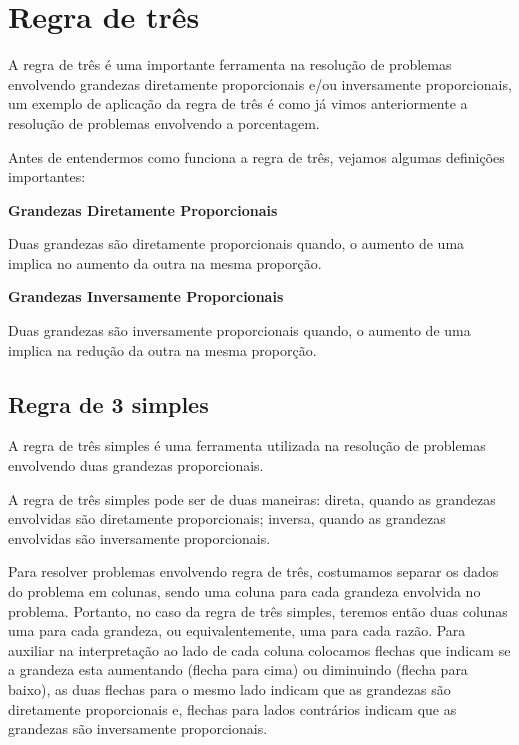 \chapter{Regra de três}

A regra de três é uma importante ferramenta na resolução de problemas envolvendo grandezas diretamente proporcionais e/ou inversamente proporcionais, um exemplo de aplicação da regra de três é como já vimos anteriormente a resolução de problemas envolvendo a porcentagem.

Antes de entendermos como funciona a regra de três, vejamos algumas definições importantes:

\vskip0.3cm

\colorbox{azul}{
 \begin{minipage}{0.9\linewidth}
 \begin{center}
 \textbf{Grandezas Diretamente Proporcionais}

   Duas grandezas são diretamente proporcionais quando, o aumento de uma implica no aumento da outra na mesma proporção.
 \end{center}
 \end{minipage}}

 \vskip0.3cm

\colorbox{azul}{
 \begin{minipage}{0.9\linewidth}
 \begin{center}
 \textbf{Grandezas Inversamente Proporcionais}

   Duas grandezas são inversamente proporcionais quando, o aumento de uma implica na redução da outra na mesma proporção.
 \end{center}
 \end{minipage}}

 \vskip0.3cm


\section{Regra de 3 simples}

A regra de três simples é uma ferramenta utilizada na resolução de problemas envolvendo duas grandezas proporcionais.

A regra de três simples pode ser de duas maneiras: direta, quando as grandezas envolvidas são diretamente proporcionais; inversa, quando as grandezas envolvidas são inversamente proporcionais.

Para resolver problemas envolvendo regra de três, costumamos separar os dados do problema em colunas, sendo uma coluna para cada grandeza envolvida no problema. Portanto, no caso da regra de três simples, teremos então duas colunas uma para cada grandeza, ou equivalentemente, uma para cada razão. Para auxiliar na interpretação ao lado de cada coluna colocamos flechas que indicam se a grandeza esta aumentando (flecha para cima) ou diminuindo (flecha para baixo), as duas flechas para o mesmo lado indicam que as grandezas são diretamente proporcionais e, flechas para lados contrários indicam que as grandezas são inversamente proporcionais.

